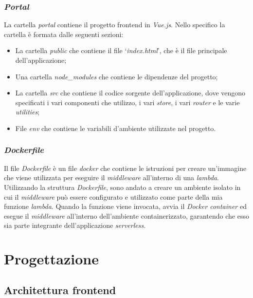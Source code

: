 \subsubsection*{\emph{Portal}}
La cartella \textit{portal} contiene il progetto frontend in \textit{Vue.js}. Nello specifico la cartella è formata dalle seguenti sezioni:
\begin{itemize}
  \item La cartella \textit{public} che contiene il file `\textit{index.html}', che è il file principale dell'applicazione;
  \item Una cartella \textit{node\_modules} che contiene le dipendenze del progetto;
  \item La cartella \textit{src} che contiene il codice sorgente dell'applicazione, dove vengono specificati i vari componenti che utilizzo, i vari \textit{store}, i vari \textit{router} e le varie \textit{utilities};
  \item File \textit{env} che contiene le variabili d'ambiente utilizzate nel progetto.
\end{itemize}

\subsubsection*{\emph{Dockerfile}}
Il file \textit{Dockerfile} è un file \textit{docker} che contiene le istruzioni per creare un'immagine che viene utilizzata per eseguire il \textit{middleware} all'interno di una \textit{lambda}.\\
Utilizzando la struttura \textit{Dockerfile}, sono andato a creare un ambiente isolato in cui il \textit{middleware} può essere configurato e utilizzato come parte della mia funzione 
\textit{lambda}. Quando la funzione viene invocata, avvia il \textit{Docker container} ed esegue il \textit{middleware} all'interno dell'ambiente containerizzato, 
garantendo che esso sia parte integrante dell'applicazione \textit{serverless}.

\section{Progettazione}\label{sec:progettazione}

\subsection{Architettura frontend}\label{subsec:architettura-front-end}
